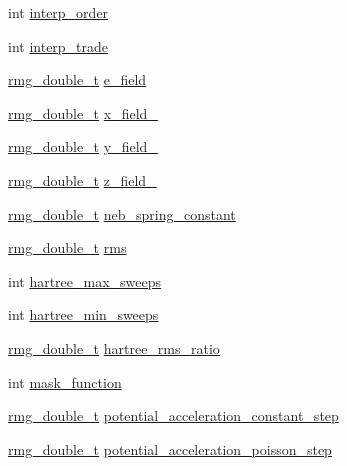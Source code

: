 \begin{DoxyCompactItemize}
int \hyperlink{struct_c_o_n_t_r_o_l_a6b425ece178cc188732d8e0e423200c3}{interp\-\_\-order}
\item 
int \hyperlink{struct_c_o_n_t_r_o_l_a045e7f32b7c87756fe1abb04cbb86033}{interp\-\_\-trade}
\item 
\hyperlink{rmgtypes_8h_aaa16921c14f121c56eaa42390a340db8}{rmg\-\_\-double\-\_\-t} \hyperlink{struct_c_o_n_t_r_o_l_abdf40bfed44bb1dae0a72f54918a3d6c}{e\-\_\-field}
\item 
\hyperlink{rmgtypes_8h_aaa16921c14f121c56eaa42390a340db8}{rmg\-\_\-double\-\_\-t} \hyperlink{struct_c_o_n_t_r_o_l_aec0e71b599b8cf3f51c51a88822e066e}{x\-\_\-field\-\_}
\item 
\hyperlink{rmgtypes_8h_aaa16921c14f121c56eaa42390a340db8}{rmg\-\_\-double\-\_\-t} \hyperlink{struct_c_o_n_t_r_o_l_a99e45b6d24a2fa5ae946bd8d1d94ca64}{y\-\_\-field\-\_}
\item 
\hyperlink{rmgtypes_8h_aaa16921c14f121c56eaa42390a340db8}{rmg\-\_\-double\-\_\-t} \hyperlink{struct_c_o_n_t_r_o_l_a00d65337d7cd9b4bfcffac5ee5b99cbe}{z\-\_\-field\-\_}
\item 
\hyperlink{rmgtypes_8h_aaa16921c14f121c56eaa42390a340db8}{rmg\-\_\-double\-\_\-t} \hyperlink{struct_c_o_n_t_r_o_l_abe7697317c33aadb1054993458a4d5dd}{neb\-\_\-spring\-\_\-constant}
\item 
\hyperlink{rmgtypes_8h_aaa16921c14f121c56eaa42390a340db8}{rmg\-\_\-double\-\_\-t} \hyperlink{struct_c_o_n_t_r_o_l_a99ae3a074fb861e689a1e89cbe0c47a8}{rms}
\item 
int \hyperlink{struct_c_o_n_t_r_o_l_afc43e2cc950c75b624d7e47ebfc51065}{hartree\-\_\-max\-\_\-sweeps}
\item 
int \hyperlink{struct_c_o_n_t_r_o_l_a7b193a466c7a09a2ce17c18c804d33fd}{hartree\-\_\-min\-\_\-sweeps}
\item 
\hyperlink{rmgtypes_8h_aaa16921c14f121c56eaa42390a340db8}{rmg\-\_\-double\-\_\-t} \hyperlink{struct_c_o_n_t_r_o_l_a8f817a8fe15901710b30c63074cb7976}{hartree\-\_\-rms\-\_\-ratio}
\item 
int \hyperlink{struct_c_o_n_t_r_o_l_a4486e8ad9ffd03004ecdf186950946c2}{mask\-\_\-function}
\item 
\hyperlink{rmgtypes_8h_aaa16921c14f121c56eaa42390a340db8}{rmg\-\_\-double\-\_\-t} \hyperlink{struct_c_o_n_t_r_o_l_a99cd5fedd1e971a611c67b105efb2ca3}{potential\-\_\-acceleration\-\_\-constant\-\_\-step}
\item 
\hyperlink{rmgtypes_8h_aaa16921c14f121c56eaa42390a340db8}{rmg\-\_\-double\-\_\-t} \hyperlink{struct_c_o_n_t_r_o_l_a801f7977a5db19224bcc4ff2c0cdc86c}{potential\-\_\-acceleration\-\_\-poisson\-\_\-step}

\end{DoxyCompactItemize}
